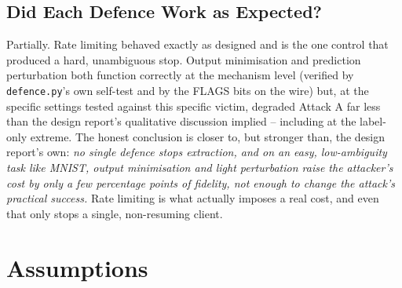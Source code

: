 \documentclass[11pt]{article}
\begin{document}
\subsection{Did Each Defence Work as Expected?}

Partially. Rate limiting behaved exactly as designed and is the one control
that produced a hard, unambiguous stop. Output minimisation and prediction
perturbation both function correctly at the mechanism level (verified by
\texttt{defence.py}'s own self-test and by the FLAGS bits on the wire) but,
at the specific settings tested against this specific victim, degraded
Attack A far less than the design report's qualitative discussion implied
-- including at the label-only extreme. The honest conclusion is closer to,
but stronger than, the design report's own: \emph{no single defence stops
extraction, and on an easy, low-ambiguity task like MNIST, output
minimisation and light perturbation raise the attacker's cost by only a few
percentage points of fidelity, not enough to change the attack's practical
success.} Rate limiting is what actually imposes a real cost, and even
that only stops a single, non-resuming client.

\section{Assumptions}
\end{document}
